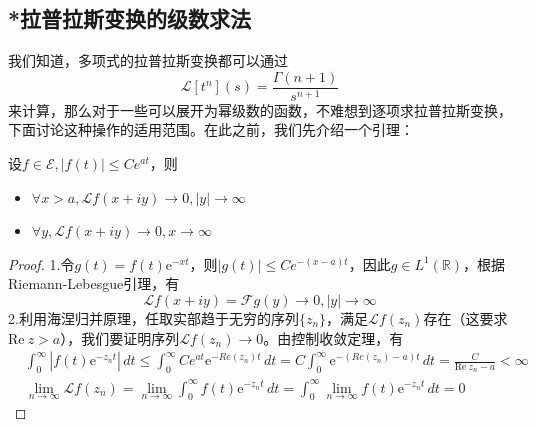\subsection{*拉普拉斯变换的级数求法}\label{sub:laplace_by_series}
我们知道，多项式的拉普拉斯变换都可以通过$$\mathcal{L} [t^n](s)=\dfrac{\Gamma(n+1)}{s^{n+1}}$$来计算，那么对于一些可以展开为幂级数的函数，不难想到逐项求拉普拉斯变换，下面讨论这种操作的适用范围。在此之前，我们先介绍一个引理：
\begin{lemma}
    设$f\in\mathcal{E} ,|f(t)|\leq Ce^{at}$，则\begin{itemize}
        \item $\forall x>a,\mathcal{L} f(x+iy)\to 0,|y|\to\infty$
        \item $\forall y,\mathcal{L} f(x+iy)\to 0,x\to\infty$
    \end{itemize}
\end{lemma}
\begin{proof}
    1.令$g(t)=f(t)\mathrm{e}^{-x t}$，则$|g(t)|\leq Ce^{-(x-a)t}$，因此$g\in L^1(\mathbb{R} )$，根据Riemann-Lebesgue引理，有
    \[\mathcal{L} f(x+iy)=\mathcal{F} g(y)\to 0,|y|\to\infty\]
    2.利用海涅归并原理，任取实部趋于无穷的序列$\{z_n\}$，满足$\mathcal{L} f(z_n)$存在（这要求$\text{Re}\ z>a$），我们要证明序列$\mathcal{L} f(z_n)\to 0$。由控制收敛定理，有
    \begin{align*}
        &\int_{0}^{\infty}|f(t)\mathrm{e}^{-z_n t}|\,dt\leq \int_0^{\infty}Ce^{at}\mathrm{e}^{-Re(z_n) t}\,dt=C\int_0^{\infty}\mathrm{e}^{-(Re(z_n)-a)t}\,dt=\frac{C}{\text{Re}\ z_n-a}<\infty\\
        &\lim_{n\to\infty}\mathcal{L} f(z_n)=\lim_{n\to\infty}\int_0^{\infty}f(t)\mathrm{e}^{-z_n t}\,dt=\int_0^{\infty}\lim_{n\to\infty}f(t)\mathrm{e}^{-z_n t}\,dt=0
    \end{align*}
\end{proof}

